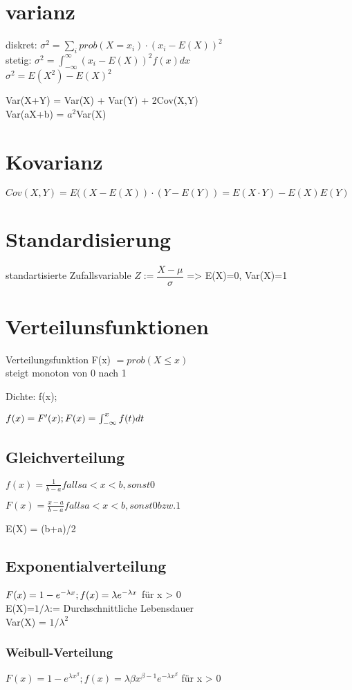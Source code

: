 \section*{varianz}
diskret: $ \sigma^2 = \sum_i prob(X=x_i)\cdot (x_i -E(X))^2$\\
stetig: $ \sigma^2 = \int_{-\infty}^{\infty} (x_i -E(X))^2 f(x) dx$ \\
$\sigma^2 = E(X^2) - E(X)^2$

Var(X+Y) = Var(X) + Var(Y) + 2Cov(X,Y)\\
Var(aX+b) = $a^2$Var(X)
\section*{Kovarianz}
$Cov(X,Y) = E((X-E(X))\cdot(Y-E(Y)) = E(X \cdot Y) -E(X)E(Y)$

\section*{Standardisierung}
standartisierte Zufallsvariable $Z:=\dfrac{X-\mu}{\sigma}$ => E(X)=0, Var(X)=1


\section*{Verteilunsfunktionen}
Verteilungsfunktion F(x) $= prob(X \leq x)$\\
steigt monoton von 0 nach 1

Dichte: f(x);

$f(x) = F'(x); \\
 F(x) = \int_{-\infty}^xf(t)dt$

\subsection*{Gleichverteilung}
$f(x) = \frac{1}{b-a} falls a < x < b, sonst 0$

$F(x)  = \frac{x-a}{b-a} falls a < x < b, sonst 0 bzw. 1$

E(X) = (b+a)/2

\subsection*{Exponentialverteilung}
$F(x) = 1 - e^{-\lambda x};  \\ f(x) = \lambda e^{-\lambda x}$ für x > 0 \\
E(X)=$1/\lambda$:= Durchschnittliche Lebensdauer\\
Var(X) = $1/\lambda^2$
\subsubsection*{Weibull-Verteilung}
$F(x) = 1 - e^{\lambda x^\beta};  f(x) = \lambda \beta x^{\beta -1} e^{-\lambda x^\beta}$ für x > 0 


